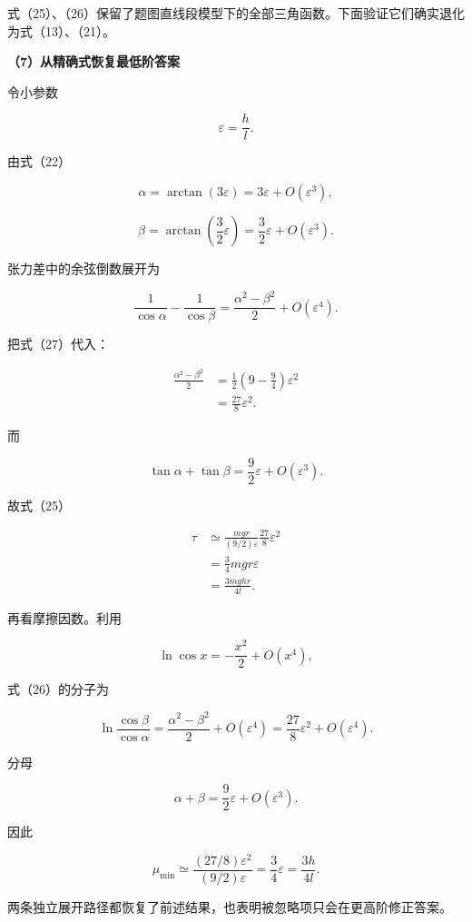 \documentclass[12pt,a4paper,UTF8]{ctexart}
\begin{document}
式（25）、（26）保留了题图直线段模型下的全部三角函数。下面验证它们确实退化为式（13）、（21）。

\textbf{（7）从精确式恢复最低阶答案}

令小参数

\[
\varepsilon=\frac hl.
\]

由式（22）

\[
\alpha=\arctan(3\varepsilon)
=3\varepsilon+O(\varepsilon^3),
\]

\[
\beta=\arctan\left(\frac32\varepsilon\right)
=\frac32\varepsilon+O(\varepsilon^3).
\tag{27}
\]

张力差中的余弦倒数展开为

\[
\frac1{\cos\alpha}-\frac1{\cos\beta}
=\frac{\alpha^2-\beta^2}{2}
+O(\varepsilon^4).
\tag{28}
\]

把式（27）代入：

\[
\begin{aligned}
\frac{\alpha^2-\beta^2}{2}
&=\frac12
\left(9-\frac94\right)\varepsilon^2\\
&=\frac{27}{8}\varepsilon^2.
\end{aligned}
\]

而

\[
\tan\alpha+\tan\beta
=\frac92\varepsilon+O(\varepsilon^3).
\]

故式（25）

\[
\begin{aligned}
\tau
&\simeq
\frac{mgr}{(9/2)\varepsilon}
\frac{27}{8}\varepsilon^2\\
&=\frac34mgr\varepsilon\\
&=\frac{3mghr}{4l}.
\end{aligned}
\]

再看摩擦因数。利用

\[
\ln\cos x=-\frac{x^2}{2}+O(x^4),
\]

式（26）的分子为

\[
\ln\frac{\cos\beta}{\cos\alpha}
=\frac{\alpha^2-\beta^2}{2}
+O(\varepsilon^4)
=\frac{27}{8}\varepsilon^2+O(\varepsilon^4).
\]

分母

\[
\alpha+\beta=\frac92\varepsilon+O(\varepsilon^3).
\]

因此

\[
\mu_{\min}
\simeq
\frac{(27/8)\varepsilon^2}{(9/2)\varepsilon}
=\frac34\varepsilon
=\frac{3h}{4l}.
\]

两条独立展开路径都恢复了前述结果，也表明被忽略项只会在更高阶修正答案。

\newpage
\end{document}
